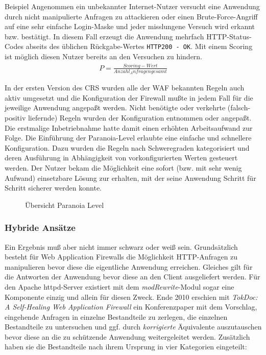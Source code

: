 \textcolor{bhtGray}{ Beispiel} Angenommen ein unbekannter Internet-Nutzer versucht eine Anwendung durch nicht manipulierte Anfragen zu attackieren oder einen Brute-Force-Angriff auf eine sehr einfache Login-Maske und jeder misslungene Versuch wird erkannt bzw. bestätigt. In diesem Fall erzeugt die Anwendung mehrfach HTTP-Status-Codes abseits des üblichen Rückgabe-Wertes \verb=HTTP200 - OK=. Mit einem Scoring ist möglich diesen Nutzer bereits an den Versuchen zu hindern.
\begin{align}
  P = \frac{Scoring-Wert}{Anzahl_Anfragen gesamt}
\end{align}

In der ersten Version des CRS wurden alle der WAF bekannten Regeln auch aktiv umgesetzt und die Konfiguration der Firewall mußte in jedem Fall für die jeweilige Anwendung angepaßt werden. Nicht benötigte oder verkehrte (falsch-positiv liefernde) Regeln wurden der Konfiguration entnommen oder angepaßt. Die erstmalige Inbetriebnahme hatte damit einen erhöhten Arbeitsaufwand zur Folge. Die Einführung der Paranoia-Level erlaubte eine einfache und schnellere Konfiguration. Dazu wurden die Regeln nach Schweregraden kategorisiert und deren Ausführung in Abhängigkeit von vorkonfigurierten Werten gesteuert werden. Der Nutzer bekam die Möglichkeit eine sofort (bzw. mit sehr wenig Aufwand) einsetzbare Lösung zur erhalten, mit der seine Anwendung Schritt für Schritt sicherer werden konnte.

\begin{figure}[ht]
  \centering
  
  \caption{Übersicht Paranoia Level \cite{owaspcrs}}
  \label{fig.paranoia}
\end{figure}



\subsubsection{Hybride Ansätze} %
Ein Ergebnis muß aber nicht immer schwarz oder weiß sein.  Grundsätzlich besteht für Web Application Firewalls die Möglichkeit HTTP-Anfragen zu manipulieren bevor diese die eigentliche Anwendung erreichen. Gleiches gilt für die Antworten der Anwendung bevor diese an den Client ausgeliefert werden. Für den Apache httpd-Server existiert mit dem \emph{modRewrite}-Modul sogar eine Komponente einzig und allein für diesen Zweck. Ende 2010 erschien mit \glqq\emph{TokDoc: A Self-Healing Web Application Firewall}\grqq \cite{Krueger2010} ein Konferenzpaper mit dem Vorschlag, eingehende Anfragen in einzelne Bestandteile zu zerlegen, die einzelnen Bestandteile zu untersuchen und ggf. durch \emph{korrigierte} Äquivalente auszutauschen bevor diese an die zu schützende Anwendung weitergeleitet werden. Zusätzlich haben sie die Bestandteile nach ihrem Ursprung in vier Kategorien eingeteilt:

